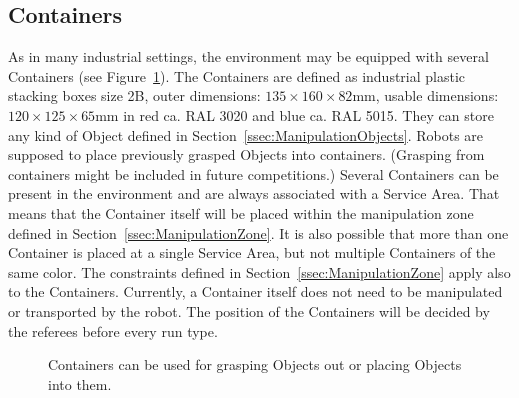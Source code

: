\subsection{Containers}
As in many industrial settings, the \RCAW environment may be equipped with several Containers (see Figure~\ref{fig:containers}). The Containers are defined as industrial plastic stacking boxes size 2B, outer dimensions: $135 \times 160 \times 82  \si{\milli\meter}$, usable dimensions: $120 \times 125 \times 65  \si{\milli\meter}$  in red ca. RAL 3020 and blue ca. RAL 5015.
They can store any kind of Object defined in Section~\ref{ssec:ManipulationObjects}. Robots are supposed to place previously grasped Objects into containers. 
(Grasping from containers might be included in future competitions.) Several Containers can be present in the environment and are always associated with a Service Area. That means that the Container itself will be placed within the manipulation zone defined in Section~\ref{ssec:ManipulationZone}.
It is also possible that more than one Container is placed at a single Service Area, but not multiple Containers of the same color.
The constraints defined in Section~\ref{ssec:ManipulationZone} apply also to the Containers.
Currently, a Container itself does not need to be manipulated or transported by the robot. The position of the Containers will be decided by the referees before every run type.

\begin{figure} [h!]
	\begin{center}
		\hspace{0.05\textwidth}
	\end{center}
	\caption{Containers can be used for grasping Objects out or placing Objects into them.}
	\label{fig:containers}
\end{figure}


